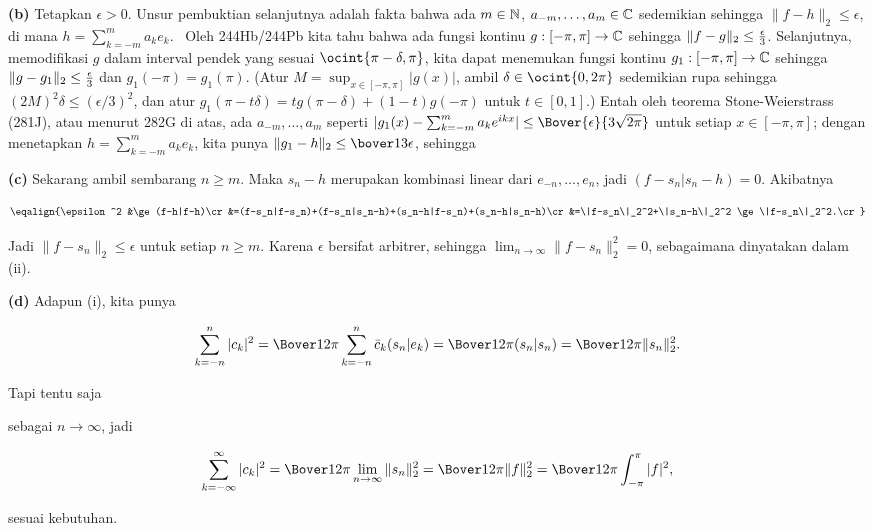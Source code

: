 {{\bf (b)} Tetapkan $\epsilon>0$.   Unsur pembuktian selanjutnya adalah fakta
bahwa ada $m\in\Bbb N$, $a_{-m},\ldots,a_m\in\Bbb C$ sedemikian sehingga
$\|f-h\|_2\le\epsilon$, di mana $h=\sum_{k=-m}^ma_ke_k$.   \Prf\ Oleh
244Hb/244Pb kita tahu bahwa ada fungsi kontinu
$g:[-\pi,\pi]\to\Bbb C$ sehingga $\|f-g\|_2\le{{\epsilon}\over 3}$.
Selanjutnya, memodifikasi $g$ dalam interval pendek yang sesuai
$\ocint{\pi-\delta,\pi}$, kita dapat menemukan fungsi kontinu
$g_1:[-\pi,\pi]\to\Bbb C$ sehingga $\|g-g_1\|_2\le{{\epsilon}\over 3}$
dan $g_1(-\pi)=g_1(\pi)$.
(Atur $M=\sup_{x\in[-\pi,\pi]}|g(x)|$, ambil $\delta\in\ocint{0,2\pi}$
sedemikian rupa sehingga $(2M)^2\delta\le(\epsilon/3)^2$, dan atur
$g_1(\pi-t\delta)=tg(\pi-\delta)+(1-t)g(-\pi)$ untuk $t\in[0,1]$.)
Entah oleh
teorema Stone-Weierstrass (281J), atau menurut 282G di atas, ada
$a_{-m},\ldots,a_m$ seperti
 $|g_1(x)-\sum_{k=-m}^ma_ke^{ikx}|\le\Bover{\epsilon}{3\sqrt{2\pi}}$
untuk setiap $x\in[-\pi,\pi]$;  dengan menetapkan $h=\sum_{k=-m}^ma_ke_k$, kita punya
$\|g_1-h\|_2\le\bover13\epsilon$, sehingga


\medskip

{\bf (c)} Sekarang ambil sembarang $n\ge m$.   Maka $s_n-h$ merupakan kombinasi linear
dari  $e_{-n},\ldots,e_n$, jadi $(f-s_n|s_n-h)=0$.   Akibatnya

$$\eqalign{\epsilon^2
&\ge(f-h|f-h)\cr
&=(f-s_n|f-s_n)+(f-s_n|s_n-h)+(s_n-h|f-s_n)+(s_n-h|s_n-h)\cr
&=\|f-s_n\|_2^2+\|s_n-h\|_2^2
\ge\|f-s_n\|_2^2.\cr}$$

\noindent Jadi $\|f-s_n\|_2\le\epsilon$ untuk setiap $n\ge m$.   Karena
$\epsilon$ bersifat arbitrer, sehingga $\lim_{n\to\infty}\|f-s_n\|_2^2=0$, sebagaimana
dinyatakan dalam (ii).

\medskip

{\bf (d)} Adapun (i), kita punya

$$\sum_{k=-n}^n|c_k|^2=\Bover1{2\pi}\sum_{k=-n}^n\bar c_k(s_n|e_k)
=\Bover1{2\pi}(s_n|s_n)=\Bover1{2\pi}\|s_n\|_2^2.$$

\noindent Tapi tentu saja


\noindent sebagai $n\to\infty$, jadi

$$\sum_{k=-\infty}^{\infty}|c_k|^2
=\Bover1{2\pi}\lim_{n\to\infty}\|s_n\|_2^2=\Bover1{2\pi}\|f\|_2^2
=\Bover1{2\pi}\int_{-\pi}^{\pi}|f|^2,$$

\noindent sesuai kebutuhan.
}%

